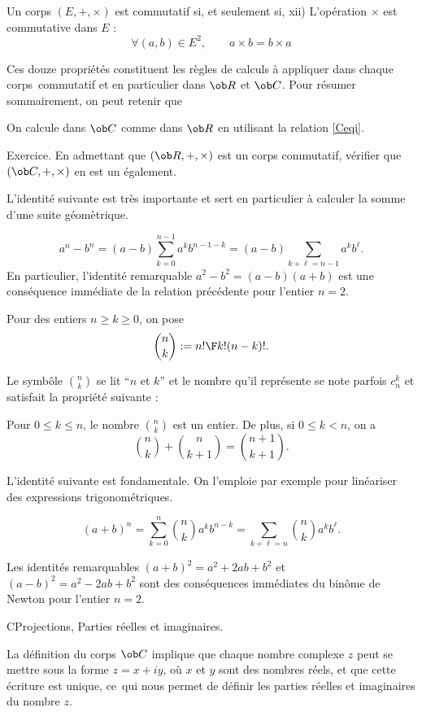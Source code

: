 \Definition 
Un corps $(E,+,\times)$ est commutatif si, et seulement si, 
\bigskip
xii) L'op\'eration $\times$ est commutative dans $E$ : 
$$
\forall (a,b)\in E^2, \qquad a\times b=b\times a
$$

Ces douze propri\'et\'es constituent les r\`egles de calculs \`a appliquer dans chaque corps~commutatif et en particulier dans $\ob R$ et $\ob C$. 
Pour r\'esumer sommairement, on peut retenir que 
\medskip
\centerline
{
On calcule dans $\ob C$ comme dans $\ob R$ en utilisant la relation \eqref{Ceqi}.
}
\bigskip

Exercice. En admettant que $(\ob R,+,\times)$ est un corps commutatif, v\'erifier que $(\ob C,+,\times)$ en est un \'egalement. 
\bigskip

\goodbreak
L'identit\'e suivante est tr\`es importante et sert en particulier \`a calculer la somme d'une suite g\'eom\`etrique. 
\bigskip

\Propriete [$n\in\ob N$ et $(a,b)\in\ob C^2$]
$$
a^n-b^n=(a-b)\sum_{k=0}^{n-1}a^kb^{n-1-k}=(a-b)\sum_{k+\ell=n-1}a^kb^\ell.
$$
En particulier, l'identit\'e remarquable $a^2-b^2=(a-b)(a+b)$ est une cons\'equence imm\'ediate 
de la relation pr\'ec\'edente pour l'entier $n=2$. 
\bigskip

\Definition 
Pour des entiers $n\ge k\ge 0$, on pose 
$$
{n\choose k}:={n!\F k!(n-k)!}.
$$

Le symb\^ole ${n\choose k}$ se lit ``$n$ et $k$'' et le nombre qu'il repr\'esente se note parfois $c_n^k$ 
et satisfait la propri\'et\'e suivante : 

\Propriete
Pour $0\le k\le n$, le nombre ${n\choose k}$ est un entier. De plus, si $0\le k<n$, on a 
$$
{n\choose k}+{n\choose k+1}={n+1\choose k+1}.
$$

L'identit\'e suivante est fondamentale. On l'emploie par exemple pour lin\'eariser des expressions trigonom\'etriques. 

\Propriete [Title=Bin\^ome de Newton;$n\in\ob N$ et $(a,b)\in\ob C^2$] 
$$
(a+b)^n=\sum_{k=0}^n{n\choose k}a^kb^{n-k}=\sum_{k+\ell=n}{n\choose k}a^kb^\ell.
$$

\noindent
Les identit\'es remarquables $(a+b)^2=a^2+2ab+b^2$ et $(a-b)^2=a^2-2ab+b^2$ sont des cons\'equences 
imm\'ediates du bin\^ome de Newton pour l'entier $n=2$. 
\bigskip

\Subsection CProjections, Parties r\'eelles et imaginaires. 

La d\'efinition du corps $\ob C$ implique que chaque nombre complexe $z$ peut se mettre sous la forme $z=x+iy$, o\`u $x$ et $y$ sont des nombres r\'eels, 
et que cette \'ecriture est unique, ce~qui nous permet de d\'efinir les parties r\'eelles et imaginaires du nombre $z$. 
\bigskip

